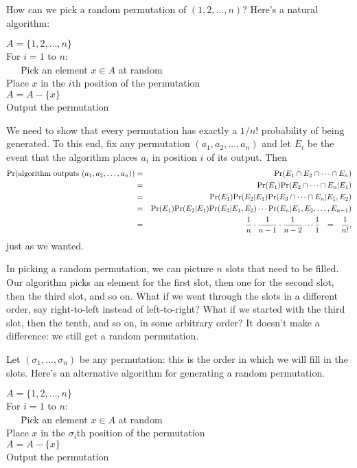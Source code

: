 How can we pick a random permutation of $(1,2,\ldots, n)$? Here's a natural algorithm:

\begin{tt}
\begin{tabbing}
$A = \{1,2,\ldots, n\}$ \\
For $i = 1$ to $n$:  \\
\ \ \ \= Pick an element $x \in A$ at random \\
      \> Place $x$ in the $i$th position of the permutation \\
      \> $A = A - \{x\}$ \\
Output the permutation
\end{tabbing}
\end{tt}

\noindent
We need to show that every permutation has exactly a $1/n!$ probability of being generated. 
To this end, fix any permutation $(a_1, a_2, \ldots, a_n)$ and let $E_i$ be the event that
the algorithm places $a_i$ in position $i$ of its output. Then
\begin{eqnarray*}
\mbox{\rm Pr}(\mbox{algorithm outputs $(a_1,a_2,\ldots,a_n)$})
& = &
\mbox{\rm Pr}(E_1 \cap E_2 \cap \cdots \cap E_n) \\
& = & 
\mbox{\rm Pr}(E_1) \mbox{\rm Pr}(E_2 \cap \cdots \cap E_n | E_1) \\
& = & 
\mbox{\rm Pr}(E_1) \mbox{\rm Pr}(E_2 | E_1) \mbox{\rm Pr}(E_3 \cap \cdots \cap E_n | E_1, E_2) \\
& = &
\mbox{\rm Pr}(E_1) \mbox{\rm Pr}(E_2 | E_1) \mbox{\rm Pr}(E_3 | E_1, E_2) \cdots \mbox{\rm Pr}(E_n | E_1, E_2, \ldots, E_{n-1}) \\
& = & 
\frac{1}{n} \cdot \frac{1}{n-1} \cdot \frac{1}{n-2} \cdots \frac{1}{1} 
\ \ = \ \ \frac{1}{n!},
\end{eqnarray*}
just as we wanted.

In picking a random permutation, we can picture $n$ slots that need to be filled. Our 
algorithm picks an element for the first slot, then one for the second slot, then the
third slot, and so on. What if we went through the slots in a different order, say
right-to-left instead of left-to-right? What if we started with the third slot, then
the tenth, and so on, in some arbitrary order? It doesn't make a difference: we still
get a random permutation.

Let $(\sigma_1, \ldots, \sigma_n)$ be any permutation: this is the order in which
we will fill in the slots. Here's an alternative algorithm for generating a random
permutation.

\begin{tt}
\begin{tabbing}
$A = \{1,2,\ldots, n\}$ \\
For $i = 1$ to $n$:  \\
\ \ \ \= Pick an element $x \in A$ at random \\
      \> Place $x$ in the $\sigma_i$th position of the permutation \\
      \> $A = A - \{x\}$ \\
Output the permutation
\end{tabbing}
\end{tt}

